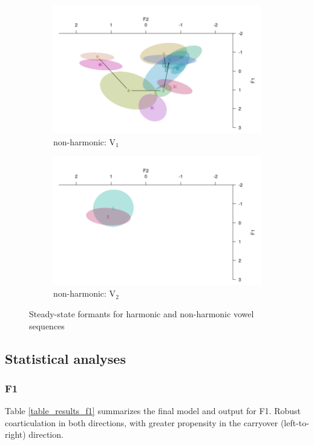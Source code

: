\documentclass[a4paper,11pt,twocolumn]{article}
\begin{document}
\begin{figure}[!ht]
	\begin{subfigure}[t]{0.2\textwidth}
		\centering
		\includegraphics[scale=0.2]{nh_v1.png} 
		\caption{non-harmonic: V$_1$} \label{nh_v1}
	\end{subfigure}
	\begin{subfigure}[t]{0.2\textwidth}
		\centering
		\includegraphics[scale=0.2]{nh_v2.png} 
		\caption{non-harmonic: V$_2$} \label{nh_v2}
	\end{subfigure}
	\caption{Steady-state formants for harmonic and non-harmonic vowel sequences}
\end{figure}

\subsection{Statistical analyses}

\subsubsection{F1}
Table \ref{table_results_f1} summarizes the final model and output for F1. Robust coarticulation in both directions, with greater propensity in the carryover (left-to-right) direction. 
\end{document}
